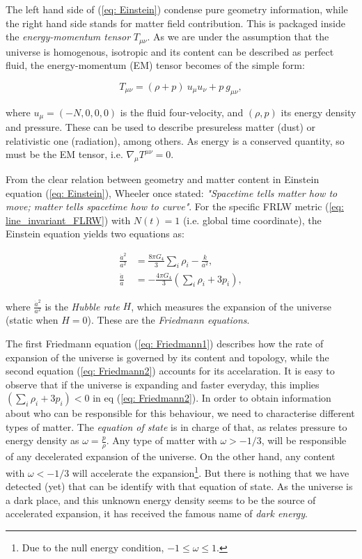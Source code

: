\documentclass[11pt, a4paper]{article} %
\begin{document}
The left hand side of (\ref{eq: Einstein}) condense pure geometry information, while the right hand side stands for matter field contribution. This is packaged inside the \textit{energy-momentum tensor} $T_{\mu\nu}$. As we are under the assumption that the universe is homogenous, isotropic and its content can be described as perfect fluid, the energy-momentum (EM) tensor becomes of the simple form:

\begin{equation}\label{eq: EMtensor}
	T_{\mu \nu} = (\rho + p) \:u_{\mu}u_{\nu} + p\: g_{\mu\nu},
\end{equation}

where $u_{\mu} = \left(-N, 0, 0, 0\right)$ is the fluid four-velocity, and $(\rho, p)$ its energy density and pressure. These can be used to describe presureless matter (dust) or relativistic one (radiation), among others. As energy is a conserved quantity, so must be the EM tensor, i.e. $\nabla_{\mu}T^{\mu \nu} =0$. 

From the clear relation between geometry and matter content in Einstein equation (\ref{eq: Einstein}), Wheeler once stated: \textit{"Spacetime tells matter how to move; matter tells spacetime how to curve"}. For the specific FRLW metric (\ref{eq: line_invariant_FLRW}) with $N(t) = 1$ (i.e. global time coordinate), the Einstein equation yields two equations as:

\begin{align}
	\label{eq: Friedmann1} \frac{\dot{a}^{2}}{a^{2}} &= \frac{8 \pi G_{4}}{3}\sum_{i} \rho_{i} - \frac{k}{a^{2}},\\
	\label{eq: Friedmann2} \frac{\ddot{a}}{a} &= -\frac{4 \pi G_{4}}{3} \left(\sum_{i} \rho_{i} + 3 p_{i}\right),
\end{align}

where $\frac{\dot{a}^{2}}{a^{2}}$ is the \textit{Hubble rate} $H$, which measures the expansion of the universe (static when $H = 0$). These are the \textit{Friedmann equations}.

The first Friedmann equation (\ref{eq: Friedmann1}) describes how the rate of expansion of the universe is governed by its content and topology, while the second equation (\ref{eq: Friedmann2}) accounts for its accelaration. It is easy to observe that if the universe is expanding and faster everyday, this implies $\left(\sum_{i} \rho_{i} + 3 p_{i}\right) < 0$ in eq (\ref{eq: Friedmann2}). In order to obtain information about who can be responsible for this behaviour, we need to characterise different types of matter. The \textit{equation of state} is in charge of that, as relates pressure to energy density as $\omega = \tfrac{p}{\rho}$. Any type of matter with $\omega > - 1/3$, will be responsible of any decelerated expansion of the universe.  On the other hand, any content with $\omega < - 1/3$ will accelerate the expansion\footnote{Due to the null energy condition\cite{}, $-1\leq\omega\leq 1$. }. But there is nothing that we have detected (yet) that can be identify with that equation of state. As the universe is a dark place, and this unknown energy density seems to be the source of accelerated expansion, it has received the famous name of \textit{dark energy}.
\end{document}
